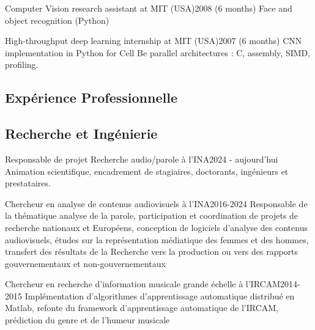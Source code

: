 \begin{en}
\begin{jobshort}{Computer Vision research assistant at MIT (USA)}{2008 (6 months)}
Face and object recognition (Python)
\end{jobshort}

\begin{jobshort}{High-throughput deep learning internship at MIT (USA)}{2007 (6 months)}
CNN implementation in Python for Cell Be parallel architectures : C, assembly, SIMD, profiling.
\end{jobshort}
\end{en}





\begin{fr}
\section{Expérience Professionnelle}


\subsection{Recherche et Ingénierie}

\begin{jobshort}{Responsable de projet Recherche audio/parole à l'INA}{2024 - aujourd'hui}
Animation scientifique, encadrement de stagiaires, doctorants, ingénieurs et prestataires.
\end{jobshort}


\begin{jobshort}{Chercheur en analyse de contenus audiovisuels à l'INA}{2016-2024}
Responsable de la thématique analyse de la parole, participation et coordination de projets de recherche nationaux et Européens, conception de logiciels d'analyse des contenus audiovisuels, études sur la représentation médiatique des femmes et des hommes, transfert des résultats de la Recherche vers la production ou vers des rapports gouvernementaux et non-gouvernementaux
\end{jobshort}


\begin{jobshort}{Chercheur en recherche d'information musicale grande échelle à l'IRCAM}{2014-2015}
Implémentation d'algorithmes d'apprentissage automatique distribué en Matlab, refonte du framework d'apprentissage automatique de l'IRCAM, prédiction du genre et de l'humeur musicale
\end{jobshort}




\end{fr}
